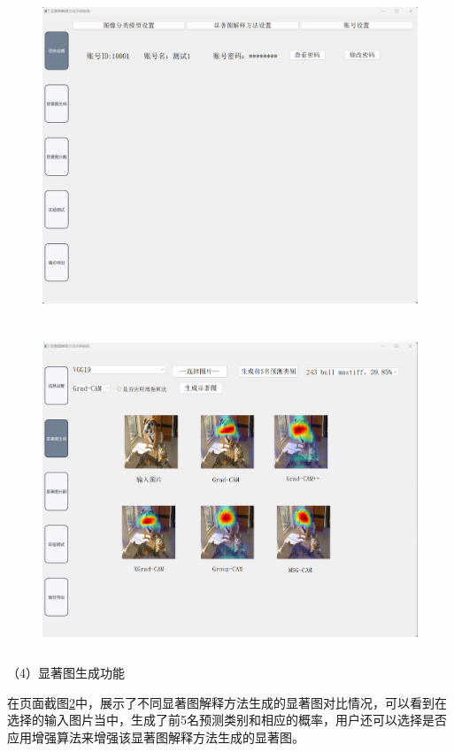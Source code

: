 \begin{figure}[h]
	\centering 
	\includegraphics[width=15cm,height=9.5cm]{fig/ch5/f3.png}
	\label{fig:f3}
\end{figure}
\begin{figure}[H]
	\centering 
	\includegraphics[width=15cm,height=9.5cm]{fig/ch5/f4.png}
	\label{fig:f4}
\end{figure}

（4）显著图生成功能

在页面截图\ref{fig:f4}中，展示了不同显著图解释方法生成的显著图对比情况，可以看到在选择的输入图片当中，生成了前5名预测类别和相应的概率，用户还可以选择是否应用增强算法来增强该显著图解释方法生成的显著图。


